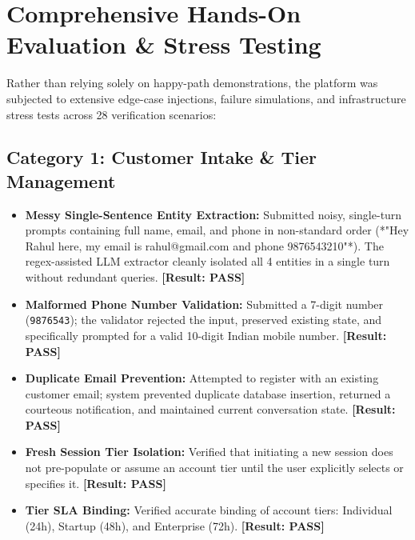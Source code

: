 \documentclass[12pt,a4paper]{article}
\begin{document}
\section{Comprehensive Hands-On Evaluation \& Stress Testing}

Rather than relying solely on happy-path demonstrations, the platform was subjected to extensive edge-case injections, failure simulations, and infrastructure stress tests across 28 verification scenarios:

\subsection{Category 1: Customer Intake \& Tier Management}
\begin{itemize}
    \item \textbf{Messy Single-Sentence Entity Extraction:} Submitted noisy, single-turn prompts containing full name, email, and phone in non-standard order (*"Hey Rahul here, my email is rahul@gmail.com and phone 9876543210"*). The regex-assisted LLM extractor cleanly isolated all 4 entities in a single turn without redundant queries. \textbf{[Result: PASS]}
    \item \textbf{Malformed Phone Number Validation:} Submitted a 7-digit number (\texttt{9876543}); the validator rejected the input, preserved existing state, and specifically prompted for a valid 10-digit Indian mobile number. \textbf{[Result: PASS]}
    \item \textbf{Duplicate Email Prevention:} Attempted to register with an existing customer email; system prevented duplicate database insertion, returned a courteous notification, and maintained current conversation state. \textbf{[Result: PASS]}
    \item \textbf{Fresh Session Tier Isolation:} Verified that initiating a new session does not pre-populate or assume an account tier until the user explicitly selects or specifies it. \textbf{[Result: PASS]}
    \item \textbf{Tier SLA Binding:} Verified accurate binding of account tiers: Individual (24h), Startup (48h), and Enterprise (72h). \textbf{[Result: PASS]}
\end{itemize}
\end{document}
